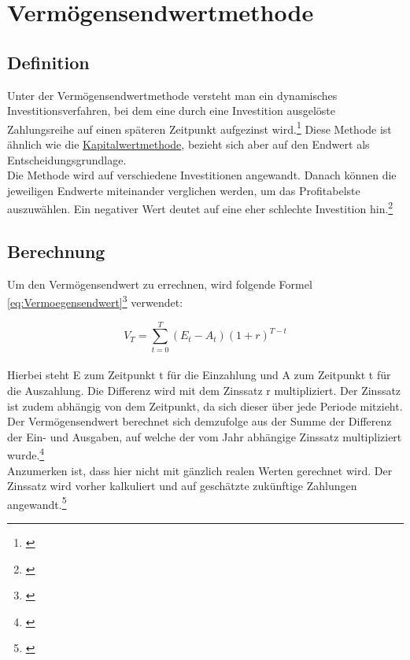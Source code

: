 \chapter{Vermögensendwertmethode}
\label{Vermoegensendwertmethode}

\section{Definition}
Unter der Vermögensendwertmethode versteht man ein dynamisches Investitionsverfahren, bei dem eine durch eine Investition ausgelöste Zahlungsreihe auf einen späteren Zeitpunkt aufgezinst wird.\footnote{\cite{finanzen-vermoegensendwertmethode}} Diese Methode ist ähnlich wie die \hyperref[Kapitalwertmethode]{Kapitalwertmethode}, bezieht sich aber auf den Endwert als Entscheidungsgrundlage.\\
Die Methode wird auf verschiedene Investitionen angewandt. Danach können die jeweiligen Endwerte miteinander verglichen werden, um das Profitabelste auszuwählen. Ein negativer Wert deutet auf eine eher schlechte Investition hin.\footnote{\cite{bwllernen-endwertmethode}}

\section{Berechnung}
Um den Vermögensendwert zu errechnen, wird folgende Formel \eqref{eq:Vermoegensendwert}\footnote{\cite{studyflix-endwertmethode}} verwendet:

\begin{equation}
    V_T = \sum_{ t = 0 }^{ T }{(E_{ t } - A_{ t })(1 + r)^{T - t}}
    \label{eq:Vermoegensendwert}
\end{equation}
\smallskip\\
Hierbei steht E zum Zeitpunkt t für die Einzahlung und A zum Zeitpunkt t für die Auszahlung. Die Differenz wird mit dem Zinssatz r multipliziert. Der Zinssatz ist zudem abhängig von dem Zeitpunkt, da sich dieser über jede Periode mitzieht. Der Vermögensendwert berechnet sich demzufolge aus der Summe der Differenz der Ein- und Ausgaben, auf welche der vom Jahr abhängige Zinssatz multipliziert wurde.\footnote{\cite{studyflix-endwertmethode}}\\

\noindent
Anzumerken ist, dass hier nicht mit gänzlich realen Werten gerechnet wird. Der Zinssatz wird vorher kalkuliert und auf geschätzte zukünftige Zahlungen angewandt.\footnote{\cite{finanzen-vermoegensendwertmethode}}


